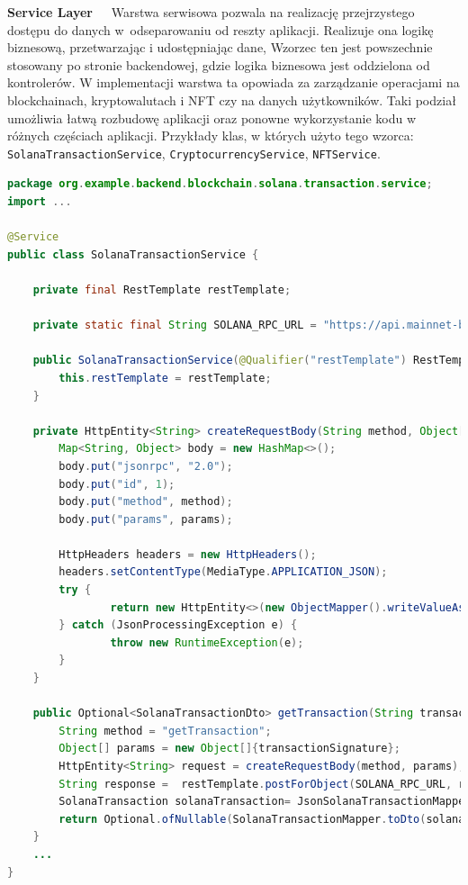 \noindent \textbf{Service Layer~~}
Warstwa serwisowa pozwala na realizację przejrzystego dostępu do danych w~odseparowaniu od reszty aplikacji. Realizuje ona logikę biznesową, przetwarzając i udostępniając dane, Wzorzec ten jest powszechnie stosowany po stronie backendowej, gdzie logika biznesowa jest oddzielona od kontrolerów. 
W implementacji warstwa ta opowiada za zarządzanie operacjami na blockchainach, kryptowalutach i NFT czy na danych użytkowników.
Taki podział umożliwia łatwą rozbudowę aplikacji oraz ponowne wykorzystanie kodu w różnych częściach aplikacji.
Przykłady klas, w których użyto tego wzorca: \texttt{SolanaTransactionService}, \texttt{CryptocurrencyService}, \texttt{NFTService}.\\[-10pt]
\begin{lstlisting}[language=Java, style=JavaStyle]
package org.example.backend.blockchain.solana.transaction.service;
import ...

@Service
public class SolanaTransactionService {
	
	private final RestTemplate restTemplate;
	
	private static final String SOLANA_RPC_URL = "https://api.mainnet-beta.solana.com";
	
	public SolanaTransactionService(@Qualifier("restTemplate") RestTemplate restTemplate) {
		this.restTemplate = restTemplate;
	}
	
	private HttpEntity<String> createRequestBody(String method, Object[] params) {
		Map<String, Object> body = new HashMap<>();
		body.put("jsonrpc", "2.0");
		body.put("id", 1);
		body.put("method", method);
		body.put("params", params);
		
		HttpHeaders headers = new HttpHeaders();
		headers.setContentType(MediaType.APPLICATION_JSON);
		try {
				return new HttpEntity<>(new ObjectMapper().writeValueAsString(body), headers);
		} catch (JsonProcessingException e) {
				throw new RuntimeException(e);
		}
	}
	
	public Optional<SolanaTransactionDto> getTransaction(String transactionSignature) {
		String method = "getTransaction";
		Object[] params = new Object[]{transactionSignature};
		HttpEntity<String> request = createRequestBody(method, params);
		String response =  restTemplate.postForObject(SOLANA_RPC_URL, request, String.class);
		SolanaTransaction solanaTransaction= JsonSolanaTransactionMapper.mapJsonToSolanaTransaction(response);
		return Optional.ofNullable(SolanaTransactionMapper.toDto(solanaTransaction));
	}
	...
}
\end{lstlisting}
